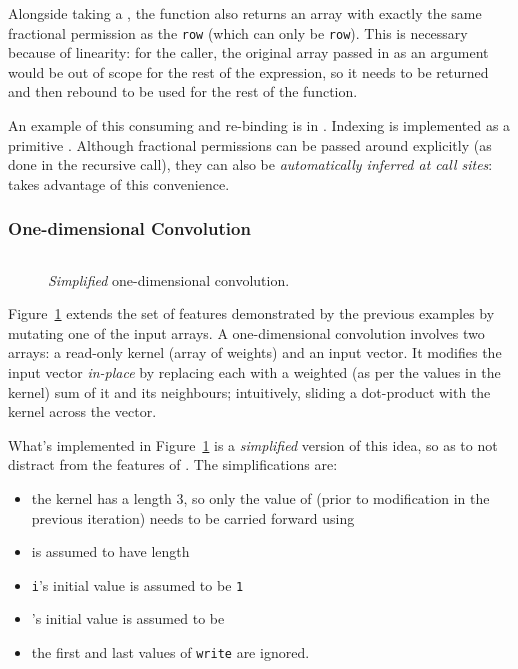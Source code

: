 Alongside taking a , the function also returns an array
with exactly the same fractional permission as the \texttt{row} (which can only
be \texttt{row}).  This is necessary because of linearity: for the caller, the
original array passed in as an argument would be out of scope for the rest of
the expression, so it needs to be returned and then rebound to be used for the
rest of the function.

An example of this consuming and re-binding is in . Indexing is implemented as a primitive . Although fractional permissions can be passed around
explicitly  (as done in the recursive call), they can also be
\emph{automatically inferred at call sites}: 
takes advantage of this convenience.

\subsubsection{One-dimensional Convolution}

\begin{figure}[t]
    \centering
    \inputminted[fontsize=\small]{ocaml}{../../examples/weighted_avg_infer.lt}
    \caption{\emph{Simplified} one-dimensional convolution.}\label{fig:lang_oned_conv}
\end{figure}

Figure~\ref{fig:lang_oned_conv} extends the set of features demonstrated by the
previous examples by mutating one of the input arrays. A one-dimensional
convolution involves two arrays: a read-only kernel (array of weights) and an
input vector. It modifies the input vector \emph{in-place} by replacing each
 with a weighted (as per the values in the kernel) sum of it
and its neighbours; intuitively, sliding a dot-product with the kernel across
the vector.

What's implemented in Figure~\ref{fig:lang_oned_conv} is a \emph{simplified}
version of this idea, so as to not distract from the features of \lang. The
simplifications are:
\begin{itemize}
    \item the kernel has a length 3, so only the value of 
        (prior to modification in the previous iteration) needs to be carried
        forward using 
    \item {} is assumed to have length 
    \item \texttt{i}'s initial value is assumed to be \texttt{1}
    \item {}'s initial value is assumed to be 
    \item the first and last values of \texttt{write} are ignored.
\end{itemize}


